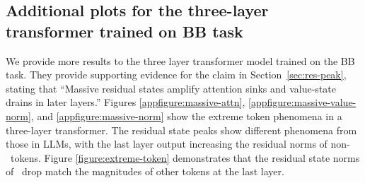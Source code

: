 \subsection{Additional plots for the three-layer transformer trained on BB task}
\label{appsec:three-layer-tf}
We provide more results to the three layer transformer model trained on the BB task. They provide supporting evidence for the claim in Section~\ref{sec:res-peak}, stating that “Massive residual states amplify attention sinks and value-state drains in later layers.”
Figures \ref{appfigure:massive-attn}, \ref{appfigure:massive-value-norm}, and \ref{appfigure:massive-norm} show the extreme token phenomena in a three-layer transformer. The residual state peaks show different phenomena from those in LLMs, with the last layer output increasing the residual norms of non-\bos~tokens. Figure \ref{figure:extreme-token}
 demonstrates that the residual state norms of \bos~drop match the magnitudes of other tokens at the last layer. 
